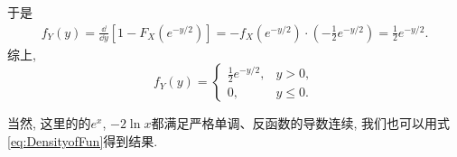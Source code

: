 \documentclass[11pt]{ctexart}
\begin{document}
\begin{solution}
\begin{enumerate}
			于是
			\begin{align*}
				f_Y(y)
				= \frac{\dd}{\dd y} \left[ 1 - F_X(e^{-y / 2}) \right]
				= - f_X(e^{-y/2}) \cdot \left(-\frac12 e^{-y/2}\right)
				= \frac{1}{2} e^{-y/2}. 
			\end{align*}
			综上, 
			\begin{equation*}
				f_Y(y) = 
					\begin{cases}
						\frac{1}{2} e^{-y/2}, & y > 0, \\
						0, & y \leq 0. 
					\end{cases}
			\end{equation*}
	\end{enumerate}
	当然, 这里的的$e^x$, $-2 \ln x$都满足严格单调、反函数的导数连续, 我们也可以用式\eqref{eq:DensityofFun}得到结果. 
\end{solution}




\end{document}
